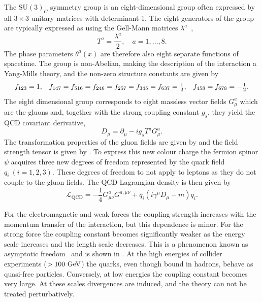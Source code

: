 The $\text{SU}(3)_C$ symmetry group is an eight-dimensional group often expressed by all $3 \times 3$ unitary matrices with determinant 1.
The eight generators of the group are typically expressed as using the Gell-Mann matrices $\lambda^a$~\cite{GellManMatrix},
\begin{equation}
    \label{eq:su3_generators}
    T^a = \frac{\lambda^a}{2}, \quad a = 1, \ldots, 8.
\end{equation}
The phase parameters $\theta^a(x)$ are therefore also eight separate functions of spacetime.
The group is non-Abelian, making the description of the interaction a Yang-Mills theory, and the non-zero structure constants are given by
\begin{equation}
    \label{eq:qcd_sc}
    \begin{array}{ccc}
        f_{123} = 1 ,                                                            & \hspace{\stretch{1}}
        f_{147} = f_{516} = f_{246} = f_{257} = f_{345} = f_{637} = \frac{1}{2}, & \hspace{\stretch{1}}
        f_{458} = f_{678} = -\frac{1}{2}.
    \end{array}
\end{equation}
The eight dimensional group corresponds to eight massless vector fields $G_\mu^a$ which are the gluons and, together with the strong coupling constant $g_s$, they yield the \Gls{QCD} covariant derivative,
\begin{equation}
    \label{eq:qcd_covariant_derivative}
    D_\mu = \partial_\mu - i g_s T^a G_\mu^a.
\end{equation}
The transformation properties of the gluon fields are given by  and the field strength tensor is given by .
To express this new colour charge the fermion spinor $\psi$ acquires three new degrees of freedom represented by the quark field $q_i\:(i = 1, 2, 3)$.
These degrees of freedom to not apply to leptons as they do not couple to the gluon fields.
The \Gls{QCD} Lagrangian density is then given by
\begin{equation}
    \label{eq:qcd_lagrangian}
    \mathcal{L}_\text{QCD} = -\frac{1}{4} G_{\mu\nu}^a G^{a,\mu\nu} + \bar q_i (i \gamma^\mu D_\mu - m) q_i.
\end{equation}

For the electromagnetic and weak forces the coupling strength increases with the momentum transfer of the interaction, but this dependence is minor.
For the strong force the coupling constant becomes significantly weaker as the energy scale increases and the length scale decreases.
This is a phenomenon known as asymptotic freedom~\cite{UltravioletBehaviorNonAbelian, ReliablePerturbativeResults, PriceAsymptoticFreedom} and is shown in .
At the high energies of collider experiments ($ > 100~\GeV$) the quarks, even though bound in hadrons, behave as quasi-free particles.
Conversely, at low energies the coupling constant becomes very large.
At these scales divergences are induced, and the theory can not be treated perturbatively.

